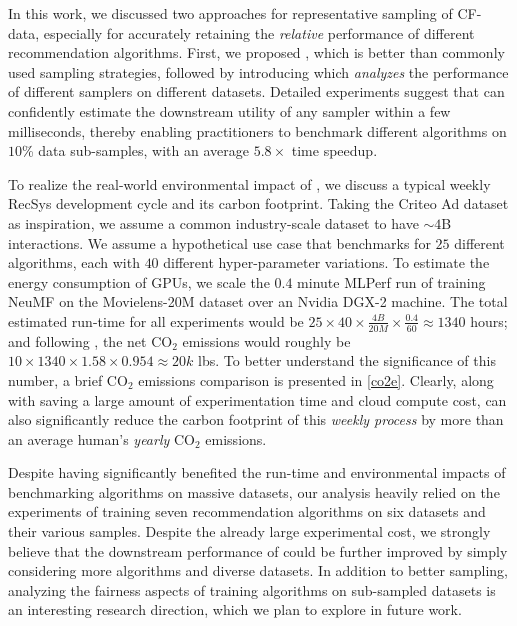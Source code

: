 In this work, we discussed two approaches for representative sampling of CF-data, especially for accurately retaining the \emph{relative} performance of different recommendation algorithms. First, we proposed \sampler, which is better than commonly used sampling strategies, followed by introducing \oracle which \emph{analyzes} the performance of different samplers on different datasets. Detailed experiments suggest that \oracle can confidently estimate the downstream utility of any sampler within a few milliseconds, thereby enabling practitioners to benchmark different algorithms on $10$\% data sub-samples, with an average $5.8\times$ time speedup.

To realize the real-world environmental impact of \oracle, we discuss a typical weekly RecSys development cycle 
and its carbon footprint. 
Taking the Criteo Ad dataset as inspiration, we assume a common industry-scale dataset to have $\sim4$B interactions.
We assume a hypothetical use case that benchmarks for \eg $25$ different algorithms, each with $40$ different hyper-parameter variations. To estimate the energy consumption of GPUs, we scale the $0.4$ minute MLPerf \cite{mlperf} run of training NeuMF \cite{neural_mf} on the Movielens-20M dataset over an Nvidia DGX-2 machine. The total estimated run-time for all experiments would be $25 \times 40 \times \frac{4B}{20M} \times \frac{0.4}{60} \approx 1340$ hours; and following \cite{co2e}, the net CO$_2$ emissions would roughly be $10 \times 1340 \times 1.58 \times 0.954 \approx 20k$ lbs. To better understand the significance of this number, a brief CO$_2$ emissions comparison is presented in \cref{co2e}. Clearly, \oracle along with saving a large amount of experimentation time and cloud compute cost, can also significantly reduce the carbon footprint of this \emph{weekly process} by more than an average human's \emph{yearly} CO$_2$ emissions.



Despite having significantly benefited the run-time and environmental impacts of benchmarking %
algorithms on massive datasets, our analysis heavily relied on the experiments of training seven 
recommendation algorithms on six datasets and their various samples. Despite the already large experimental cost, we strongly believe that the downstream performance of \oracle could be further improved by simply 
considering
more algorithms and diverse datasets.
In addition to better sampling, analyzing the fairness 
aspects of training algorithms on sub-sampled datasets is an interesting research direction, which we plan to explore in future work.
